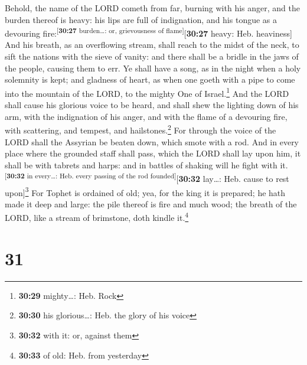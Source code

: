  Behold, the name of the LORD cometh from far, burning
with his anger, and the burden thereof is heavy: his lips are full of
indignation, and his tongue as a devouring
fire:\textsuperscript{{[}\textbf{30:27} burden\ldots: or, grievousness
of flame{]}}{[}\textbf{30:27} heavy: Heb. heaviness{]} 
And his breath, as an overflowing stream, shall reach to the midst of
the neck, to sift the nations with the sieve of vanity: and there shall
be a bridle in the jaws of the people, causing them to err.
 Ye shall have a song, as in the night when a holy
solemnity is kept; and gladness of heart, as when one goeth with a pipe
to come into the mountain of the LORD, to the mighty One of
Israel.\footnote{\textbf{30:29} mighty\ldots: Heb. Rock} 
And the LORD shall cause his glorious voice to be heard, and shall shew
the lighting down of his arm, with the indignation of his anger, and
with the flame of a devouring fire, with scattering, and tempest, and
hailstones.\footnote{\textbf{30:30} his glorious\ldots: Heb. the glory
  of his voice}  For through the voice of the LORD shall
the Assyrian be beaten down, which smote with a rod.  And
in every place where the grounded staff shall pass, which the LORD shall
lay upon him, it shall be with tabrets and harps: and in battles of
shaking will he fight with it.\textsuperscript{{[}\textbf{30:32} in
every\ldots: Heb. every passing of the rod founded{]}}{[}\textbf{30:32}
lay\ldots: Heb. cause to rest upon{]}\footnote{\textbf{30:32} with it:
  or, against them}  For Tophet is ordained of old; yea,
for the king it is prepared; he hath made it deep and large: the pile
thereof is fire and much wood; the breath of the LORD, like a stream of
brimstone, doth kindle it.\footnote{\textbf{30:33} of old: Heb. from
  yesterday}

\hypertarget{section-30}{%
\section{31}\label{section-30}}

